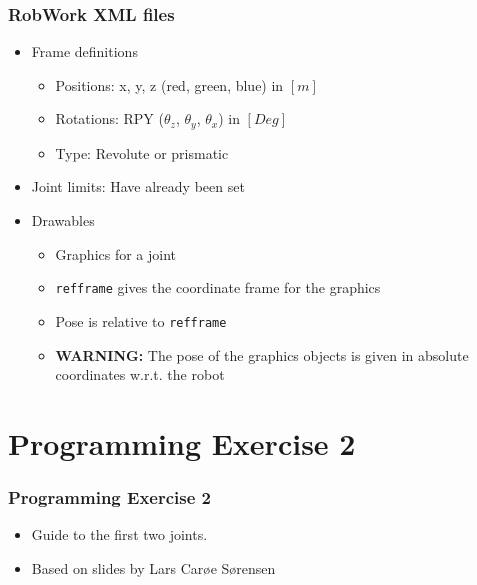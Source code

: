 \documentclass{beamer}
\begin{document}
\begin{frame}
  \frametitle{RobWork XML files}
  \begin{itemize}
  \item Frame definitions
    \begin{itemize}
    \item Positions: x, y, z (red, green, blue) in $[m]$
    \item Rotations: RPY ($\theta_z$, $\theta_y$, $\theta_x$) in $[Deg]$
    \item Type: Revolute or prismatic
    \end{itemize}
  \item Joint limits: Have already been set
  \item Drawables
    \begin{itemize}
    \item Graphics for a joint
    \item \texttt{refframe} gives the coordinate frame for the graphics
    \item Pose is relative to \texttt{refframe}
    \item \textbf{WARNING: } The pose of the graphics objects is given in absolute coordinates w.r.t. the robot  
    \end{itemize}
  \end{itemize}
\end{frame}


\section{Programming Exercise 2}

\begin{frame}
  \frametitle{Programming Exercise 2}
  \begin{itemize}
  \item Guide to the first two joints.
    \item Based on slides by Lars Carøe Sørensen
  \end{itemize}
\end{frame}

\end{document}
